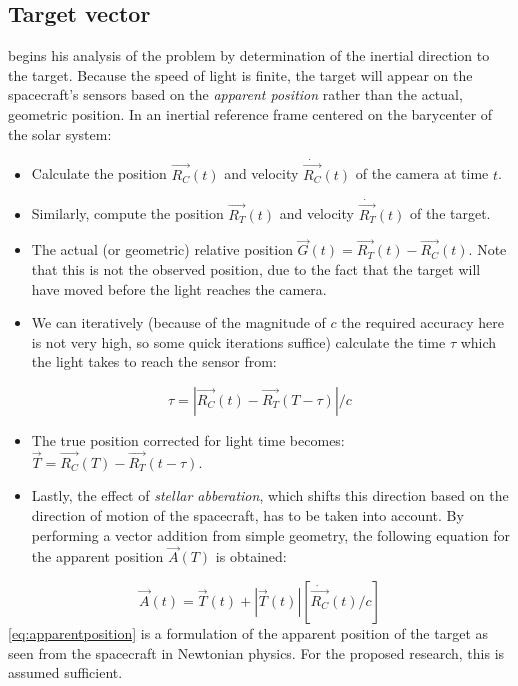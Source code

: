 \subsection{Target vector}
\cite{OpNav} begins his analysis of the problem by determination of the inertial direction to the target. Because the speed of light is finite, the target will appear on the spacecraft's sensors based on the \textit{apparent position} rather than the actual, geometric position. In an inertial reference frame centered on the barycenter of the solar system:
\begin{itemize}
    \item Calculate the position $\vec{R_{C}}(t)$ and velocity $\dot{\vec{R_{C}}}(t)$ of the camera at time $t$.
    \item Similarly, compute the position $\vec{R_T}(t)$ and velocity $\dot{\vec{R_T}}(t)$ of the target.
    \item The actual (or geometric) relative position $\vec{G}(t) = \vec{R_T}(t) - \vec{R_C}(t)$. Note that this is not the observed position, due to the fact that the target will have moved before the light reaches the camera.
    \item We can iteratively (because of the magnitude of $c$ the required accuracy here is not very high, so some quick iterations suffice) calculate the time $\tau$ which the light takes to reach the sensor from:
\end{itemize}
\begin{equation}
    \tau=|\vec{R_C}(t) - \vec{R_T}(T-\tau)|/c
\end{equation}
\begin{itemize}
    \item The true position corrected for light time becomes: $\vec{T} = \vec{R_C}(T) - \vec{R_T}(t-\tau)$.
    \item Lastly, the effect of \textit{stellar abberation}, which shifts this direction based on the direction of motion of the spacecraft, has to be taken into account. By performing a vector addition from simple geometry, the following equation for the apparent position $\vec{A}(T)$ is obtained:
\end{itemize}
\begin{equation}
    \vec{A}(t) = \vec{T}(t) + |\vec{T}(t)|[\dot{\vec{R_C}}(t)/c]
    \label{eq:apparentposition}
\end{equation}
\autoref{eq:apparentposition} is a formulation of the apparent position of the target as seen from the spacecraft in Newtonian physics. For the proposed research, this is assumed sufficient.

